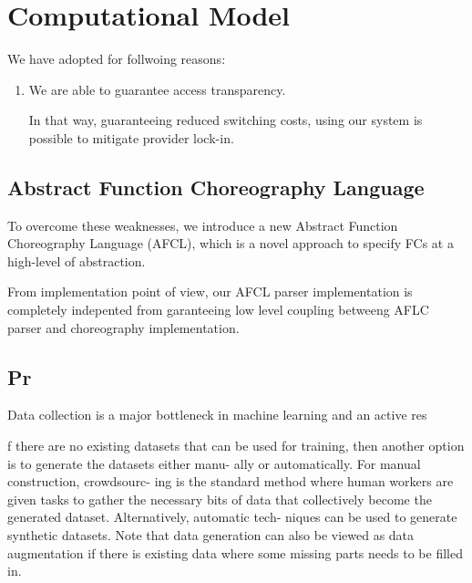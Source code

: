 \documentclass[12pt,a4paper]{report}
\theoremstyle{definition}
\begin{document}
\newpage


\chapter{Computational Model}






We have adopted for follwoing reasons:

\begin{enumerate}
	\item We are able to guarantee access transparency. 
	
 
	
	In that way, guaranteeing reduced switching costs, using our system is possible to mitigate provider lock-in.
	
\end{enumerate}

\section{Abstract Function Choreography Language}

To overcome these weaknesses, we introduce a new Abstract
Function Choreography Language (AFCL), which is a novel approach
to specify FCs at a high-level of abstraction. 



From implementation point of view, our AFCL parser implementation is completely indepented from 
garanteeing low level coupling betweeng AFLC parser and choreography implementation.



\section{Pr}

Data collection is a major bottleneck in machine learning and an active res


f there are no existing datasets that can be used for training,
then another option is to generate the datasets either manu-
ally or automatically. For manual construction, crowdsourc-
ing is the standard method where human workers are given
tasks to gather the necessary bits of data that collectively
become the generated dataset. Alternatively, automatic tech-
niques can be used to generate synthetic datasets. Note that
data generation can also be viewed as data augmentation if
there is existing data where some missing parts needs to be
filled in.
\end{document}
